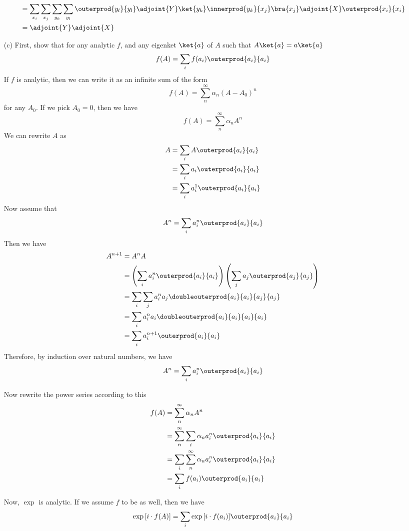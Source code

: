 \begin{itemize}
\begin{align*}
    &=
    \sum_{x_i}\sum_{x_j}\sum_{y_k}\sum_{y_l}
    \outerprod{y_l}{y_l}\adjoint{Y}
    \ket{y_k}\innerprod{y_k}{x_j}\bra{x_j}
    \adjoint{X}\outerprod{x_i}{x_i} \\
    &=
    \adjoint{Y}\adjoint{X}
  \end{align*}
\item[(c)] First, show that for any analytic $f$, and any eigenket
  $\ket{a}$ of $A$ such that $A\ket{a} = a\ket{a}$
  \[ f(A) = \sum_i f(a_i)\outerprod{a_i}{a_i} \]
  If $f$ is analytic, then we can write it as an infinite sum of the form
  \[ f(A) = \sum_n^{\infty} \alpha_n(A - A_0)^n \]
  for any $A_0$.  If we pick $A_0 = 0$, then we have
  \[ f(A) = \sum_n^{\infty} \alpha_n A^n \]
  We can rewrite $A$ as
  \begin{align*}
    A
    &=
    \sum_i A\outerprod{a_i}{a_i} \\
    &=
    \sum_i a_i\outerprod{a_i}{a_i} \\
    &=
    \sum_i a_i^1\outerprod{a_i}{a_i}
  \end{align*}
  Now assume that
  \[ A^n = \sum_i a_i^n\outerprod{a_i}{a_i} \]
  Then we have
  \begin{align*}
    A^{n+1} &= A^n A \\
    &=
    \left(\sum_i a_i^n\outerprod{a_i}{a_i}\right)
    \left(\sum_j a_j\outerprod{a_j}{a_j}\right) \\
    &=
    \sum_i\sum_j a_i^n a_j\doubleouterprod{a_i}{a_i}{a_j}{a_j} \\
    &=
    \sum_i a_i^n a_i\doubleouterprod{a_i}{a_i}{a_i}{a_i} \\
    &=
    \sum_i a_i^{n+1}\outerprod{a_i}{a_i}
  \end{align*}
  Therefore, by induction over natural numbers, we have
  \[ A^n = \sum_i a_i^{n}\outerprod{a_i}{a_i} \]

  Now rewrite the power series according to this
  \begin{align*}
    f(A)
    &=
    \sum_n^{\infty} \alpha_n A^n \\
    &=
    \sum_n^{\infty}\sum_i \alpha_n a_i^n\outerprod{a_i}{a_i} \\
    &=
    \sum_i\sum_n^{\infty} \alpha_n a_i^n\outerprod{a_i}{a_i} \\
    &=
    \sum_i f(a_i)\outerprod{a_i}{a_i}
  \end{align*}

  Now, $\exp$ is analytic.  If we assume $f$ to be as well, then we have
  \[ \exp{[i\cdot f(A)]} = \sum_i\exp{[i\cdot f(a_i)]}\outerprod{a_i}{a_i} \]


\end{itemize}
